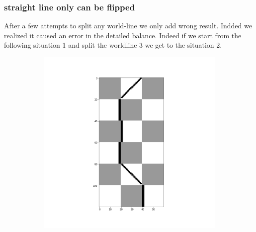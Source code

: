 \documentclass[a4paper,12pt,twoside]{article}
\begin{document}
		 	
		 
		 
		 \subsubsection{straight line only can be flipped}
		 After a few attempts to split any world-line we only add wrong result. Indded we realized it caused an error in the detailed balance.
		 Indeed if we start from the following situation 1 and split the worldline 3 we get to the situation 2.
		 
		 \begin{figure}[!h]
		 	\centering
		 	\begin{subfigure}[b]{0.3\textwidth}
		 		\includegraphics[scale=0.2]{situation1.png}
		 	\end{subfigure}
		 	\begin{subfigure}[b]{0.3\textwidth}

\end{subfigure}
\end{figure}
\end{document}
